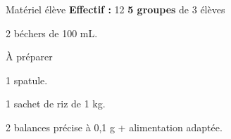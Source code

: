 
\begin{boiteMateriel}{Matériel élève}
  \textbf{Effectif :} 12
  \qq{}\qq{}
  \flecheLongue \textbf{5 groupes} de 3 élèves

  \begin{protocole}
    \item 2 béchers de 100 mL.
  \end{protocole}
\end{boiteMateriel}


\begin{boiteMateriel}{À préparer}
  \begin{protocole}
    \item 1 spatule.
    \item 1 sachet de riz de 1 kg.
    \item 2 balances précise à 0,1 g + alimentation adaptée.
  \end{protocole}
\end{boiteMateriel}